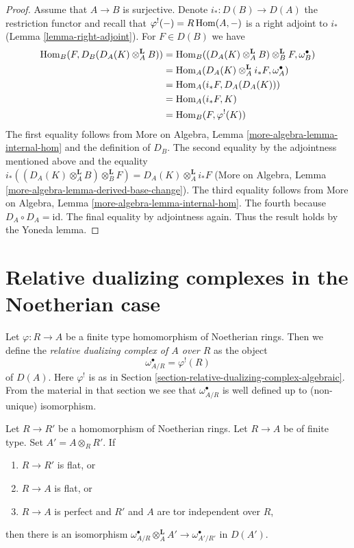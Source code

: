 \begin{proof}
\medskip\noindent
Assume that $A \to B$ is surjective. Denote $i_* : D(B) \to D(A)$
the restriction functor and recall that $\varphi^!(-) = R\mathop{\mathrm{Hom}}\nolimits(A, -)$
is a right adjoint to $i_*$ (Lemma \ref{lemma-right-adjoint}).
For $F \in D(B)$ we have
\begin{align*}
\mathop{\mathrm{Hom}}\nolimits_B(F, D_B(D_A(K) \otimes_A^\mathbf{L} B))
& =
\mathop{\mathrm{Hom}}\nolimits_B((D_A(K) \otimes_A^\mathbf{L} B) \otimes_B^\mathbf{L} F,
\omega_B^\bullet) \\
& =
\mathop{\mathrm{Hom}}\nolimits_A(D_A(K) \otimes_A^\mathbf{L} i_*F, \omega_A^\bullet) \\
& =
\mathop{\mathrm{Hom}}\nolimits_A(i_*F, D_A(D_A(K))) \\
& =
\mathop{\mathrm{Hom}}\nolimits_A(i_*F, K) \\
& =
\mathop{\mathrm{Hom}}\nolimits_B(F, \varphi^!(K))
\end{align*}
The first equality follows from More on Algebra, Lemma
\ref{more-algebra-lemma-internal-hom} and the definition
of $D_B$. The second equality by the adjointness mentioned
above and the equality
$i_*((D_A(K) \otimes_A^\mathbf{L} B) \otimes_B^\mathbf{L} F) =
D_A(K) \otimes_A^\mathbf{L} i_*F$
(More on Algebra, Lemma \ref{more-algebra-lemma-derived-base-change}).
The third equality follows from More on Algebra, Lemma
\ref{more-algebra-lemma-internal-hom}. The fourth because
$D_A \circ D_A = \text{id}$. The final equality by adjointness again.
Thus the result holds by the Yoneda lemma.
\end{proof}






\section{Relative dualizing complexes in the Noetherian case}
\label{section-relative-dualizing-complexes-Noetherian}

\noindent
Let $\varphi : R \to A$ be a finite type homomorphism of
Noetherian rings. Then we define the {\it relative dualizing
complex of $A$ over $R$} as the object
$$
\omega_{A/R}^\bullet = \varphi^!(R)
$$
of $D(A)$. Here $\varphi^!$ is as in
Section \ref{section-relative-dualizing-complex-algebraic}.
From the material in that section we see that
$\omega_{A/R}^\bullet$ is well defined up to (non-unique) isomorphism.

\begin{lemma}
\label{lemma-base-change-relative-algebraic}
Let $R \to R'$ be a homomorphism of Noetherian rings.
Let $R \to A$ be of finite type. Set $A' = A \otimes_R R'$. If
\begin{enumerate}
\item $R \to R'$ is flat, or
\item $R \to A$ is flat, or
\item $R \to A$ is perfect
and $R'$ and $A$ are tor independent over $R$,
\end{enumerate}
then there is an isomorphism
$\omega_{A/R}^\bullet \otimes_A^\mathbf{L} A' \to \omega^\bullet_{A'/R'}$
in $D(A')$.
\end{lemma}

